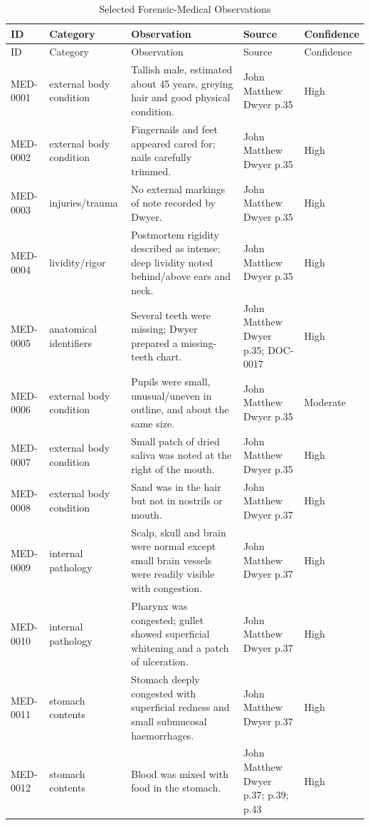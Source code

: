 \begin{longtable}{p{}p{}p{}p{}p{}}
\caption{Selected Forensic-Medical Observations}\label{tab:medical-observations}\\
\toprule
ID & Category & Observation & Source & Confidence \\
\midrule
\endfirsthead
\toprule
ID & Category & Observation & Source & Confidence \\
\midrule
\endhead
MED-0001 & external body condition & Tallish male, estimated about 45 years, greying hair and good physical condition. & John Matthew Dwyer p.35 & High \\
MED-0002 & external body condition & Fingernails and feet appeared cared for; nails carefully trimmed. & John Matthew Dwyer p.35 & High \\
MED-0003 & injuries/trauma & No external markings of note recorded by Dwyer. & John Matthew Dwyer p.35 & High \\
MED-0004 & lividity/rigor & Postmortem rigidity described as intense; deep lividity noted behind/above ears and neck. & John Matthew Dwyer p.35 & High \\
MED-0005 & anatomical identifiers & Several teeth were missing; Dwyer prepared a missing-teeth chart. & John Matthew Dwyer p.35; DOC-0017 & High \\
MED-0006 & external body condition & Pupils were small, unusual/uneven in outline, and about the same size. & John Matthew Dwyer p.35 & Moderate \\
MED-0007 & external body condition & Small patch of dried saliva was noted at the right of the mouth. & John Matthew Dwyer p.35 & High \\
MED-0008 & external body condition & Sand was in the hair but not in nostrils or mouth. & John Matthew Dwyer p.37 & High \\
MED-0009 & internal pathology & Scalp, skull and brain were normal except small brain vessels were readily visible with congestion. & John Matthew Dwyer p.37 & High \\
MED-0010 & internal pathology & Pharynx was congested; gullet showed superficial whitening and a patch of ulceration. & John Matthew Dwyer p.37 & High \\
MED-0011 & stomach contents & Stomach deeply congested with superficial redness and small submucosal haemorrhages. & John Matthew Dwyer p.37 & High \\
MED-0012 & stomach contents & Blood was mixed with food in the stomach. & John Matthew Dwyer p.37; p.39; p.43 & High \\

\end{longtable}
